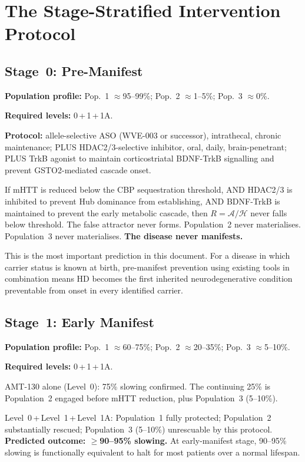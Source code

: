 \documentclass[12pt,a4paper]{article}
\newenvironment{predenv}[1]{%
  \begin{tcolorbox}[
    colback=blue!4,
    colframe=headerblue,
    boxrule=1pt,
    arc=3pt,
    title={\bfseries\color{white}#1},
    colbacktitle=headerblue,
    left=8pt, right=8pt,
    top=6pt, bottom=6pt,
    breakable
  ]
}{%
  \end{tcolorbox}
}
\newcommand{\Rratio}{R}
\newcommand{\IA}{\mathcal{A}}
\newcommand{\Hub}{\mathcal{H}}
\begin{document}
\section{The Stage-Stratified Intervention Protocol}

\subsection{Stage~0: Pre-Manifest}

\textbf{Population profile:}
Pop.~1 $\approx$95--99\%;
Pop.~2 $\approx$1--5\%;
Pop.~3 $\approx$0\%.

\textbf{Required levels:} 0\,+\,1\,+\,1A.

\textbf{Protocol:} allele-selective ASO (WVE-003 or
successor), intrathecal, chronic maintenance; PLUS
HDAC2/3-selective inhibitor, oral, daily, brain-penetrant;
PLUS TrkB agonist to maintain corticostriatal BDNF-TrkB
signalling and prevent GSTO2-mediated cascade onset.

\begin{predenv}{Geometric Prediction --- Stage 0: Prevention}
If mHTT is reduced below the CBP sequestration threshold,
AND HDAC2/3 is inhibited to prevent Hub dominance from
establishing, AND BDNF-TrkB is maintained to prevent the
early metabolic cascade, then $\Rratio = \IA/\Hub$ never
falls below threshold. The false attractor never forms.
Population~2 never materialises. Population~3 never
materialises. \textbf{The disease never manifests.}

This is the most important prediction in this document.
For a disease in which carrier status is known at birth,
pre-manifest prevention using existing tools in combination
means HD becomes the first inherited neurodegenerative
condition preventable from onset in every identified carrier.
\end{predenv}

\subsection{Stage~1: Early Manifest}

\textbf{Population profile:}
Pop.~1 $\approx$60--75\%;
Pop.~2 $\approx$20--35\%;
Pop.~3 $\approx$5--10\%.

\textbf{Required levels:} 0\,+\,1\,+\,1A.

\begin{predenv}{Geometric Prediction --- Stage 1: Near-Halt}
AMT-130 alone (Level~0): 75\% slowing confirmed.
The continuing 25\% is Population~2 engaged before mHTT
reduction, plus Population~3 (5--10\%).

Level~0\,+\,Level~1\,+\,Level~1A: Population~1 fully
protected; Population~2 substantially rescued;
Population~3 (5--10\%) unrescuable by this protocol.
\textbf{Predicted outcome: $\geq$90--95\% slowing.}
At early-manifest stage, 90--95\% slowing is functionally
equivalent to halt for most patients over a normal lifespan.
\end{predenv}
\end{document}
